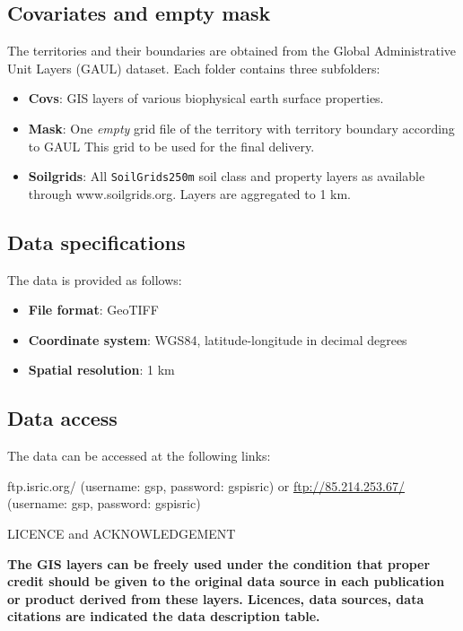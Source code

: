 \documentclass[10pt,b5paper,]{book}
\providecommand{\tightlist}{%
  \setlength{\itemsep}{0pt}\setlength{\parskip}{0pt}}
\theoremstyle{definition}
\theoremstyle{definition}
\theoremstyle{definition}
\theoremstyle{remark}
\begin{document}
\hypertarget{covariates-and-empty-mask}{%
\subsection{Covariates and empty mask}\label{covariates-and-empty-mask}}

The territories and their boundaries are obtained from the Global
Administrative Unit Layers (GAUL) dataset. Each folder contains three
subfolders:

\begin{itemize}
\tightlist
\item
  \textbf{Covs}: GIS layers of various biophysical earth surface
  properties.
\item
  \textbf{Mask}: One \emph{empty} grid file of the territory with
  territory boundary according to GAUL This grid to be used for the
  final delivery.
\item
  \textbf{Soilgrids}: All \texttt{SoilGrids250m} soil class and property
  layers as available through www.soilgrids.org. Layers are aggregated
  to 1 km.
\end{itemize}

\hypertarget{data-specifications}{%
\subsection{Data specifications}\label{data-specifications}}

The data is provided as follows:

\begin{itemize}
\tightlist
\item
  \textbf{File format}: GeoTIFF
\item
  \textbf{Coordinate system}: WGS84, latitude-longitude in decimal
  degrees
\item
  \textbf{Spatial resolution}: 1 km
\end{itemize}

\hypertarget{data-access}{%
\subsection{Data access}\label{data-access}}

The data can be accessed at the following links:

ftp.isric.org/ (username: gsp, password: gspisric) or
\url{ftp://85.214.253.67/} (username: gsp, password: gspisric)

LICENCE and ACKNOWLEDGEMENT

\textbf{The GIS layers can be freely used under the condition that
proper credit should be given to the original data source in each
publication or product derived from these layers. Licences, data
sources, data citations are indicated the data description table.}
\end{document}
